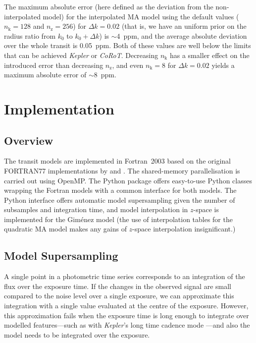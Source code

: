 \documentclass[usenatbib,usegraphicx,useAMS]{mn2e}
\newcommand{\kepler}{\textit{Kepler}\xspace}
\newcommand{\corot}{\textit{CoRoT}\xspace}
\newcommand{\gimenez}{Gim\'enez\xspace}
\begin{document}
{The maximum absolute error (here defined as the deviation from the non-interpolated model) for the interpolated
MA model using the default values ($n_\mathrm{k}=128$ and $n_\mathrm{z}=256$) for $\Delta k=0.02$ (that is, we have an
uniform prior on the radius ratio from $k_0$ to $k_0+\Delta k$) is $\sim$4~ppm, and the average absolute
deviation over the whole transit is 0.05~ppm. Both of these values are well below the limits that can be achieved
\kepler or \corot. Decreasing $n_\mathrm{k}$ has a smaller effect on the introduced error than decreasing
$n_\mathrm{z}$, and even $n_\mathrm{k}=8$ for $\Delta k=0.02$ yields a maximum absolute error of $\sim$8~ppm.

\section{Implementation}
\label{sec:implementation}
\subsection{Overview}
\label{sec:implementation:overview}
The transit models are implemented in Fortran~2003 based on the original FORTRAN77 implementations by 
\citeauthor{Gimenez2006} and \citeauthor{Mandel2002}. The shared-memory parallelisation is carried out using OpenMP. The 
Python package offers easy-to-use Python classes wrapping the Fortran models with a common interface for both models. 
The Python interface offers automatic model supersampling given the number of subsamples and integration time, and model 
interpolation in $z$-space is implemented for the \gimenez model (the use of interpolation tables for the quadratic MA 
model makes any gains of $z$-space interpolation insignificant.)

\subsection{Model Supersampling}
\label{sec:implementation:supersampling}
A single point in a photometric time series corresponds to an integration of the flux over the exposure time. If the 
changes in the observed signal are small compared to the noise level over a single exposure, we can approximate this 
integration with a single value evaluated at the centre of the exposure. However, this approximation fails when the 
exposure time is long enough to integrate over modelled features---such as with \textit{Kepler}'s long time cadence mode 
\citep{Kipping2010a}---and also the model needs to be integrated over the exposure.

}
\end{document}
